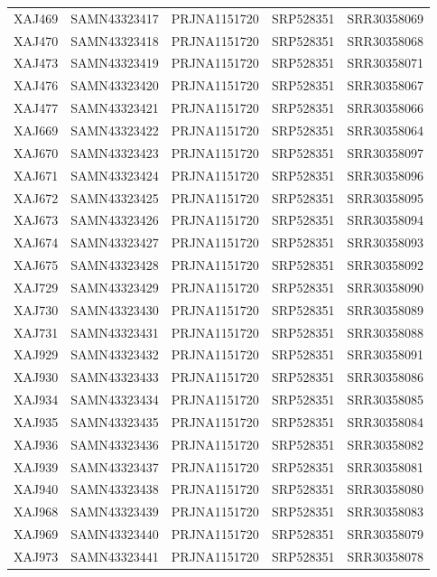 \documentclass[
]{book}
\begin{document}
\begin{longtable}[]{@{}ccccc@{}}
XAJ469 & SAMN43323417 & PRJNA1151720 & SRP528351 & SRR30358069 \\
XAJ470 & SAMN43323418 & PRJNA1151720 & SRP528351 & SRR30358068 \\
XAJ473 & SAMN43323419 & PRJNA1151720 & SRP528351 & SRR30358071 \\
XAJ476 & SAMN43323420 & PRJNA1151720 & SRP528351 & SRR30358067 \\
XAJ477 & SAMN43323421 & PRJNA1151720 & SRP528351 & SRR30358066 \\
XAJ669 & SAMN43323422 & PRJNA1151720 & SRP528351 & SRR30358064 \\
XAJ670 & SAMN43323423 & PRJNA1151720 & SRP528351 & SRR30358097 \\
XAJ671 & SAMN43323424 & PRJNA1151720 & SRP528351 & SRR30358096 \\
XAJ672 & SAMN43323425 & PRJNA1151720 & SRP528351 & SRR30358095 \\
XAJ673 & SAMN43323426 & PRJNA1151720 & SRP528351 & SRR30358094 \\
XAJ674 & SAMN43323427 & PRJNA1151720 & SRP528351 & SRR30358093 \\
XAJ675 & SAMN43323428 & PRJNA1151720 & SRP528351 & SRR30358092 \\
XAJ729 & SAMN43323429 & PRJNA1151720 & SRP528351 & SRR30358090 \\
XAJ730 & SAMN43323430 & PRJNA1151720 & SRP528351 & SRR30358089 \\
XAJ731 & SAMN43323431 & PRJNA1151720 & SRP528351 & SRR30358088 \\
XAJ929 & SAMN43323432 & PRJNA1151720 & SRP528351 & SRR30358091 \\
XAJ930 & SAMN43323433 & PRJNA1151720 & SRP528351 & SRR30358086 \\
XAJ934 & SAMN43323434 & PRJNA1151720 & SRP528351 & SRR30358085 \\
XAJ935 & SAMN43323435 & PRJNA1151720 & SRP528351 & SRR30358084 \\
XAJ936 & SAMN43323436 & PRJNA1151720 & SRP528351 & SRR30358082 \\
XAJ939 & SAMN43323437 & PRJNA1151720 & SRP528351 & SRR30358081 \\
XAJ940 & SAMN43323438 & PRJNA1151720 & SRP528351 & SRR30358080 \\
XAJ968 & SAMN43323439 & PRJNA1151720 & SRP528351 & SRR30358083 \\
XAJ969 & SAMN43323440 & PRJNA1151720 & SRP528351 & SRR30358079 \\
XAJ973 & SAMN43323441 & PRJNA1151720 & SRP528351 & SRR30358078 \\

\end{longtable}
\end{document}
